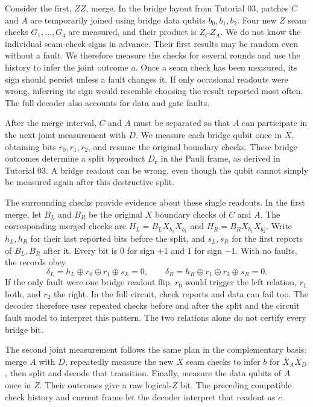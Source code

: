 \documentclass[11pt,a4paper]{article}
\newcommand{\XL}{\overline X}
\newcommand{\ZL}{\overline Z}
\begin{document}
Consider the first, $ZZ$, merge. In the bridge layout from Tutorial 03,
patches $C$ and $A$ are temporarily joined using bridge data qubits
$b_0,b_1,b_2$. Four new $Z$ seam checks $G_1,\ldots,G_4$ are measured,
and their product is $\ZL_C\ZL_A$. We do not know the individual seam-check
signs in advance. Their first results may be random even without a fault.
We therefore measure the checks for several rounds and use the history
to infer the joint outcome $a$. Once a seam check has been measured,
its sign should persist unless a fault changes it. If only occasional
readouts were wrong, inferring its sign would resemble choosing the
result reported most often. The full decoder also accounts for data
and gate faults.

After the merge interval, $C$ and $A$ must be separated so that $A$ can participate in the next joint measurement with $D$. We measure each bridge qubit once in $X$, obtaining bits $r_0,r_1,r_2$, and resume the original boundary checks. These bridge outcomes determine a split byproduct $D_{\mathbf r}$ in the Pauli frame, as derived in Tutorial 03. A bridge readout can be wrong, even though the qubit cannot simply be measured again after this destructive split.

The surrounding checks provide evidence about these single readouts. In the first merge, let $B_L$ and $B_R$ be the original $X$ boundary checks of $C$ and $A$. The corresponding merged checks are $H_L=B_LX_{b_0}X_{b_1}$ and $H_R=B_RX_{b_1}X_{b_2}$. Write $h_L,h_R$ for their last reported bits before the split, and $s_L,s_R$ for the first reports of $B_L,B_R$ after it. Every bit is $0$ for sign $+1$ and $1$ for sign $-1$. With no faults, the records obey
\[
\delta_L=h_L\oplus r_0\oplus r_1\oplus s_L=0,
\qquad
\delta_R=h_R\oplus r_1\oplus r_2\oplus s_R=0.
\]
If the only fault were one bridge readout flip, $r_0$ would trigger the left relation, $r_1$ both, and $r_2$ the right. In the full circuit, check reports and data can fail too. The decoder therefore uses repeated checks before and after the split and the circuit fault model to interpret this pattern. The two relations alone do not certify every bridge bit.

The second joint measurement follows the same plan in the complementary basis: merge $A$ with $D$, repeatedly measure the new $X$ seam checks to infer $b$ for $\XL_A\XL_D$, then split and decode that transition. Finally, measure the data qubits of $A$ once in $Z$. Their outcomes give a raw logical-$Z$ bit. The preceding compatible check history and current frame let the decoder interpret that readout as $c$.
\end{document}
